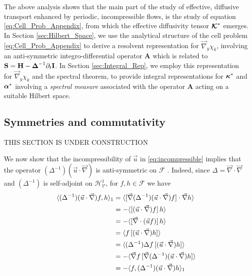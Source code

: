 \documentclass[11pt]{amsart}
\newcommand{\Hb}{\mathbf{H}}
\newcommand{\Ib}{\mathbf{I}}
\newcommand{\Sb}{\mathbf{S}}
\newcommand{\Ab}{\mathbf{A}}
\newcommand\Kbc{\mbox{\boldmath${\mathcal{K}}$}}
\newcommand{\Vc}{\mathcal{V}}
\newcommand{\Hc}{\mathcal{H}}
\newcommand{\Fc}{\mathcal{F}}
\newcommand\balpha{\mbox{\boldmath${\alpha}$}}
\newcommand\bDelta{\mbox{\boldmath${\Delta}$}}
\newcommand\bkappa{\mbox{\boldmath${\kappa}$}}
\begin{document}
The above analysis shows that the main part of the study of effective, 
diffusive transport enhanced by periodic, incompressible flows, is the
study of equation \eqref{eq:Cell_Prob_Appendix}, from which the
effective diffusivity tensor $\Kbc^*$ emerges. In Section
\ref{sec:Hilbert_Space}, we use the analytical structure of the cell
problem \eqref{eq:Cell_Prob_Appendix} to derive a resolvent
representation for $\vec{\nabla}_y\chi_k$, involving an anti-symmetric
integro-differential operator $\Ab$ which is related to 
$\Sb=\Hb-\bDelta^{-1}\partial_t\Ib$. In Section \ref{sec:Integral_Rep}, 
we employ this representation for $\vec{\nabla}_y\chi_k$ and the spectral
theorem, to provide integral representations for $\bkappa^*$ and
$\balpha^*$ involving a \emph{spectral measure} associated with the
operator $\Ab$ acting on a suitable Hilbert space.     
   

\subsection{Symmetries and commutativity}\label{sec:Symmetries_Commute}
%
THIS SECTION IS UNDER CONSTRUCTION

We now show that the incompressibility of $\vec{u}$ in
\eqref{eq:incompressible} implies that the operator
$(\Delta^{-1})(\vec{u}\cdot\vec{\nabla})$ is anti-symmetric on $\Fc$
\cite{Bhattacharya:AAP:1999:951}. Indeed, since $\Delta=\vec{\nabla}\cdot\vec{\nabla}$
and $(\Delta^{-1})$ is self-adjoint on $\Hc^1_{\Vc}$, for $f,h\in\Fc$ we have 
%
\begin{align}\label{eq:Anti-sym_Sobolev}
  \langle(\Delta^{-1})(\vec{u}\cdot\vec{\nabla})f,h\rangle_1
                            &=\langle[\vec{\nabla}(\Delta^{-1})(\vec{u}\cdot\vec{\nabla})f]\cdot\vec{\nabla}h\rangle
                                 \\                              
                              &=-\langle[(\vec{u}\cdot\vec{\nabla})f]\,h\rangle
                                 \notag\\
                               &=-\langle[\vec{\nabla}\cdot(\vec{u}f)]\,h\rangle
                                 \notag\\     
                              &=\langle f\,[(\vec{u}\cdot\vec{\nabla})h]\rangle
                                \notag\\
                              &=\langle(\Delta^{-1})\Delta f\,[(\vec{u}\cdot\vec{\nabla})h]\rangle
                                \notag\\
                              &=-\langle\vec{\nabla}f\,[\vec{\nabla}(\Delta^{-1})(\vec{u}\cdot\vec{\nabla})h]\rangle
                                \notag\\                              
                              &=-\langle f,(\Delta^{-1})(\vec{u}\cdot\vec{\nabla})h\rangle_1
                              \notag
\end{align}
%
%
\end{document}
